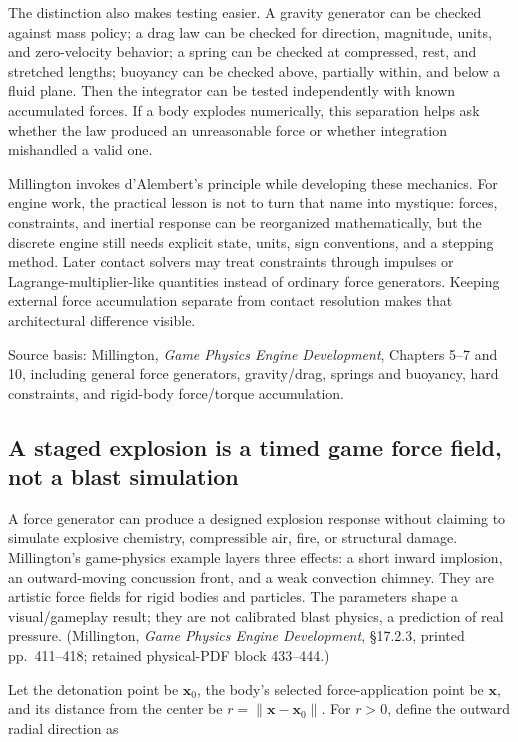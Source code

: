 The distinction also makes testing easier. A gravity generator can be checked against mass policy; a drag law can be checked for direction, magnitude, units, and zero-velocity behavior; a spring can be checked at compressed, rest, and stretched lengths; buoyancy can be checked above, partially within, and below a fluid plane. Then the integrator can be tested independently with known accumulated forces. If a body explodes numerically, this separation helps ask whether the law produced an unreasonable force or whether integration mishandled a valid one.

Millington invokes d'Alembert's principle while developing these mechanics. For engine work, the practical lesson is not to turn that name into mystique: forces, constraints, and inertial response can be reorganized mathematically, but the discrete engine still needs explicit state, units, sign conventions, and a stepping method. Later contact solvers may treat constraints through impulses or Lagrange-multiplier-like quantities instead of ordinary force generators. Keeping external force accumulation separate from contact resolution makes that architectural difference visible.

Source basis: Millington, \emph{Game Physics Engine Development}, Chapters 5--7 and 10, including general force generators, gravity/drag, springs and buoyancy, hard constraints, and rigid-body force/torque accumulation.

\subsection{A staged explosion is a timed game force field, not a blast simulation}\label{06-engine-ii-ch034-a-staged-explosion-is-a-timed-game-force-field-not-a-blast-simulation}

A force generator can produce a designed explosion response without claiming to simulate explosive chemistry, compressible air, fire, or structural damage. Millington's game-physics example layers three effects: a short inward implosion, an outward-moving concussion front, and a weak convection chimney. They are artistic force fields for rigid bodies and particles. The parameters shape a visual/gameplay result; they are not calibrated blast physics, a prediction of real pressure. (Millington, \emph{Game Physics Engine Development}, §17.2.3, printed pp.~411--418; retained physical-PDF block 433--444.)

Let the detonation point be \(\mathbf{x}_0\), the body's selected force-application point be \(\mathbf{x}\), and its distance from the center be \(r=\lVert\mathbf{x}-\mathbf{x}_0\rVert\). For \(r>0\), define the outward radial direction as

